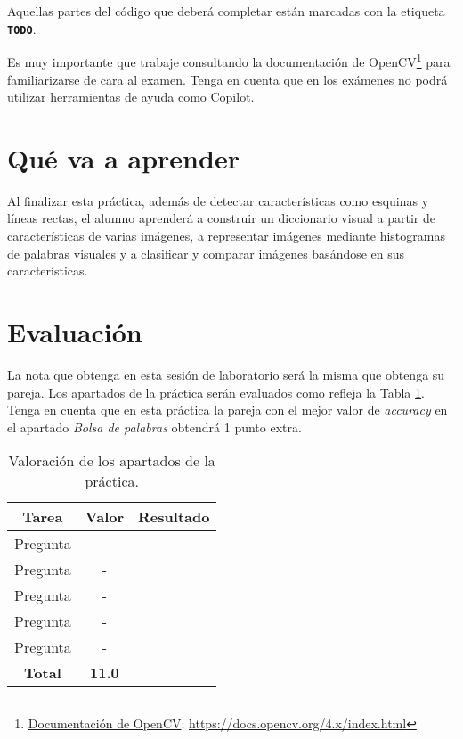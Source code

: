 Aquellas partes del código que deberá completar están marcadas con la etiqueta \textbf{\texttt{TODO}}.

Es muy importante que trabaje consultando la documentación de OpenCV\footnote{\href{https://docs.opencv.org/4.x/index.html}{Documentación de OpenCV}: \url{https://docs.opencv.org/4.x/index.html}} para familiarizarse de cara al examen. Tenga en cuenta que en los exámenes no podrá utilizar herramientas de ayuda como Copilot.

\section{Qué va a aprender}

Al finalizar esta práctica, además de detectar características como esquinas y líneas rectas, el alumno aprenderá a construir un diccionario visual a partir de características de varias imágenes, a representar imágenes mediante histogramas de palabras visuales y a clasificar y comparar imágenes basándose en sus características. 

\section{Evaluación}

La nota que obtenga en esta sesión de laboratorio será la misma que obtenga su pareja. Los apartados de la práctica serán evaluados como refleja la Tabla \ref{table:evaluacion}. Tenga en cuenta que en esta práctica la pareja con el mejor valor de \textit{accuracy} en el apartado \textit{Bolsa de palabras} obtendrá 1 punto extra.

\begin{table}[h!]
    \centering
    \begin{tabular}{|c|c|c|}
    \hline
    \textbf{Tarea} & \textbf{Valor} & \textbf{Resultado} \\
    \hline
    Pregunta & - & \\
    \hline
    Pregunta & - & \\
    \hline
    Pregunta & - & \\
    \hline
    Pregunta & - & \\
    \hline
    Pregunta & - & \\
    \hline
    \textbf{Total} & \textbf{11.0} & \\
    \hline
    \end{tabular}
    \caption{Valoración de los apartados de la práctica.}
    \label{table:evaluacion}
\end{table}
